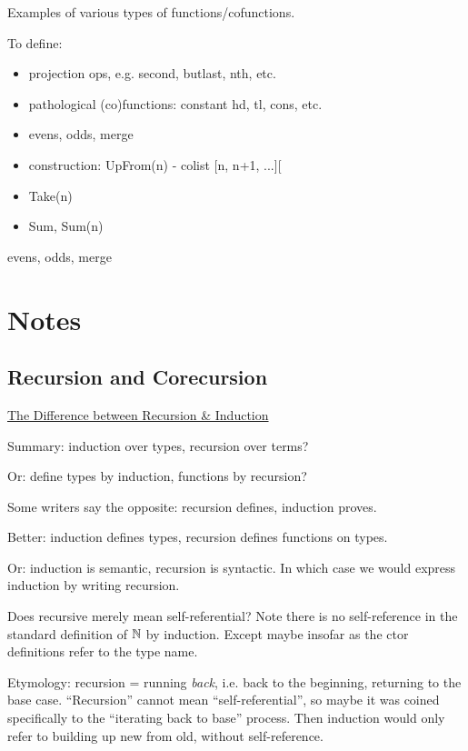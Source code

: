 \documentclass{article}
\begin{document}
Examples of various types of functions/cofunctions.

To define:

\begin{itemize}
\item projection ops, e.g. second, butlast, nth, etc.
\item pathological (co)functions: constant hd, tl, cons, etc.
\item evens, odds, merge
\item construction: UpFrom(n) - colist [n, n+1, ...][
\item Take(n)
\item Sum, Sum(n)
\end{itemize}

evens, odds, merge

\section{Notes}

\subsection{Recursion and Corecursion}

\href{http://blog.ezyang.com/2013/04/the-difference-between-recursion-induction/}{The Difference between Recursion \& Induction}

Summary: induction over types, recursion over terms?

Or: define types by induction, functions by recursion?

Some writers say the opposite: recursion defines, induction proves.

Better: induction defines types, recursion defines functions on types.

Or: induction is semantic, recursion is syntactic. In which case we would express induction by writing recursion.

Does recursive merely mean self-referential? Note there is no
self-reference in the standard definition of \(\mathbb{N}\) by induction.
Except maybe insofar as the ctor definitions refer to the type name.

Etymology: recursion = running \textit{back}, i.e. back to the
beginning, returning to the base case. ``Recursion'' cannot mean
``self-referential'', so maybe it was coined specifically to the
``iterating back to base'' process. Then induction would only refer to
building up new from old, without self-reference.
\end{document}
